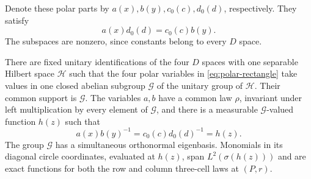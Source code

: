 Denote these polar parts by $a(x),b(y),c_0(c),d_0(d)$, respectively.  They
satisfy
\begin{equation}\label{eq:polar-rectangle}
 a(x)d_0(d)=c_0(c)b(y).
\end{equation}
The subspaces are nonzero, since constants belong to every $D$ space.

\begin{lemma}\label{lem:polar-group}
There are fixed unitary identifications of the four $D$ spaces with one
separable Hilbert space $\mathcal H$ such that the four polar variables
in \eqref{eq:polar-rectangle} take values in one closed abelian subgroup
$\mathcal G$ of the unitary group of $\mathcal H$.  Their common support
is $\mathcal G$.  The variables $a,b$ have a common law $\rho$, invariant
under left multiplication by every element of $\mathcal G$, and there
is a measurable $\mathcal G$-valued function $h(z)$ such that
\begin{equation}\label{eq:corner-ratio}
 a(x)b(y)^{-1}=c_0(c)d_0(d)^{-1}=h(z).
\end{equation}
The group $\mathcal G$ has a simultaneous orthonormal eigenbasis.
Monomials in its diagonal circle coordinates, evaluated at $h(z)$,
span $L^2(\sigma(h(z)))$ and are exact functions for both the row and
column three-cell laws at $(P,r)$.
\end{lemma}

